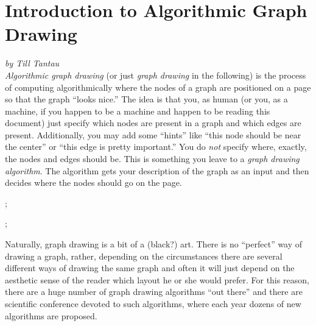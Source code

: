 %
%
%


\section{Introduction to Algorithmic Graph Drawing}

{\noindent\emph{by Till Tantau}}
\\

\emph{Algorithmic graph drawing} (or just \emph{graph drawing} in the
following) is the process of computing algorithmically where the nodes of
a graph are positioned on a page so that the graph ``looks nice.'' The
idea is that you, as human (or you, as a machine, if you happen to be
a machine and happen to be reading this document) just specify which
nodes are present in a graph and which edges are
present. Additionally, you may add some ``hints'' like ``this node
should be near the center'' or ``this edge is pretty important.'' You
do \emph{not} specify where, exactly, the nodes and edges should
be. This is something you leave to a \emph{graph drawing
  algorithm}. The algorithm gets your description of the graph as an
input and then decides where the nodes should go on the page.

\begin{codeexample}[]
\tikz {};
\end{codeexample}

\begin{codeexample}[]
\tikz {};  
\end{codeexample}

Naturally, graph drawing is a bit of a (black?) art. There is no
``perfect'' way of drawing a graph, rather, depending on the
circumstances there are several different ways of drawing the same
graph and often it will just depend on the aesthetic sense of the
reader which layout he or she would prefer. For this reason, there are
a huge number of graph drawing algorithms ``out there'' and there are
scientific conference devoted to such algorithms, where each
year dozens of new algorithms are proposed.

